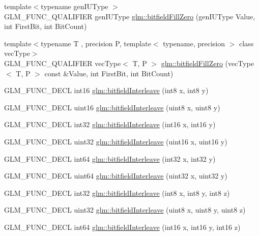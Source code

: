 \begin{DoxyCompactItemize}
\item 
{\footnotesize template$<$typename gen\+I\+U\+Type $>$ }\\G\+L\+M\+\_\+\+F\+U\+N\+C\+\_\+\+Q\+U\+A\+L\+I\+F\+I\+ER gen\+I\+U\+Type \hyperlink{group__gtc__bitfield_ga697b86998b7d74ee0a69d8e9f8819fee}{glm\+::bitfield\+Fill\+Zero} (gen\+I\+U\+Type Value, int First\+Bit, int Bit\+Count)
\item 
{\footnotesize template$<$typename T , precision P, template$<$ typename, precision $>$ class vec\+Type$>$ }\\G\+L\+M\+\_\+\+F\+U\+N\+C\+\_\+\+Q\+U\+A\+L\+I\+F\+I\+ER vec\+Type$<$ T, P $>$ \hyperlink{group__gtc__bitfield_gaddba3196316b0bd240295b09b43c2958}{glm\+::bitfield\+Fill\+Zero} (vec\+Type$<$ T, P $>$ const \&Value, int First\+Bit, int Bit\+Count)
\item 
G\+L\+M\+\_\+\+F\+U\+N\+C\+\_\+\+D\+E\+CL int16 \hyperlink{group__gtc__bitfield_ga479134317bc95d99f2b2e235d3db287b}{glm\+::bitfield\+Interleave} (int8 x, int8 y)
\item 
G\+L\+M\+\_\+\+F\+U\+N\+C\+\_\+\+D\+E\+CL uint16 \hyperlink{group__gtc__bitfield_ga0700a3ceb088a0ecc23d76c154096061}{glm\+::bitfield\+Interleave} (uint8 x, uint8 y)
\item 
G\+L\+M\+\_\+\+F\+U\+N\+C\+\_\+\+D\+E\+CL int32 \hyperlink{group__gtc__bitfield_ga1a0264598647ae00a596865af4e1e878}{glm\+::bitfield\+Interleave} (int16 x, int16 y)
\item 
G\+L\+M\+\_\+\+F\+U\+N\+C\+\_\+\+D\+E\+CL uint32 \hyperlink{group__gtc__bitfield_ga19ef8360379483e3ee245e89cb62ff93}{glm\+::bitfield\+Interleave} (uint16 x, uint16 y)
\item 
G\+L\+M\+\_\+\+F\+U\+N\+C\+\_\+\+D\+E\+CL int64 \hyperlink{group__gtc__bitfield_ga0de51d5985e6a703f305a5a61479babd}{glm\+::bitfield\+Interleave} (int32 x, int32 y)
\item 
G\+L\+M\+\_\+\+F\+U\+N\+C\+\_\+\+D\+E\+CL uint64 \hyperlink{group__gtc__bitfield_ga2bc87fd66f6f8471c1a46888360cef12}{glm\+::bitfield\+Interleave} (uint32 x, uint32 y)
\item 
G\+L\+M\+\_\+\+F\+U\+N\+C\+\_\+\+D\+E\+CL int32 \hyperlink{group__gtc__bitfield_ga6dee2ce1c45805063bb7fc5f6fd8f5ca}{glm\+::bitfield\+Interleave} (int8 x, int8 y, int8 z)
\item 
G\+L\+M\+\_\+\+F\+U\+N\+C\+\_\+\+D\+E\+CL uint32 \hyperlink{group__gtc__bitfield_gab9d593a2e916beb8f8137a0dbeae3afe}{glm\+::bitfield\+Interleave} (uint8 x, uint8 y, uint8 z)
\item 
G\+L\+M\+\_\+\+F\+U\+N\+C\+\_\+\+D\+E\+CL int64 \hyperlink{group__gtc__bitfield_gaf898f842ac089fcc8d6201c32702584a}{glm\+::bitfield\+Interleave} (int16 x, int16 y, int16 z)

\end{DoxyCompactItemize}
